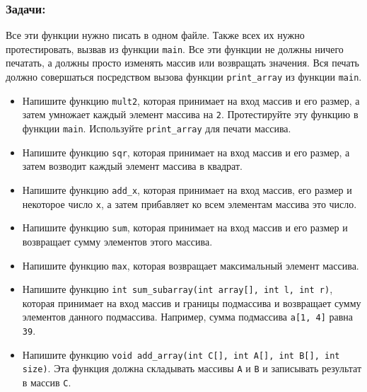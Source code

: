 \documentclass{article}
\begin{document}
\subsubsection*{Задачи:}
Все эти функции нужно писать в одном файле. Также всех их нужно протестировать, вызвав из функции \texttt{main}. Все эти функции не должны ничего печатать, а должны просто изменять массив или возвращать значения. Вся печать должно совершаться посредством вызова функции \texttt{print\_array} из функции \texttt{main}.
\begin{itemize}
\item Напишите функцию \texttt{mult2}, которая принимает на вход массив и его размер, а затем умножает каждый элемент массива на \texttt{2}. Протестируйте эту функцию в функции \texttt{main}. Используйте \texttt{print\_array} для печати массива.
\item Напишите функцию \texttt{sqr}, которая принимает на вход массив и его размер, а затем возводит каждый элемент массива в квадрат.
\item Напишите функцию \texttt{add\_x}, которая принимает на вход массив, его размер и некоторое число \texttt{x}, а затем прибавляет ко всем элементам массива это число.
\item Напишите функцию \texttt{sum}, которая принимает на вход массив и его размер и возвращает сумму элементов этого массива.
\item Напишите функцию \texttt{max}, которая возвращает максимальный элемент массива.
\item Напишите функцию \texttt{int sum\_subarray(int array[], int l, int r)}, которая принимает на вход массив и границы подмассива и возвращает сумму элементов данного подмассива. Например, сумма подмассива \texttt{a[1, 4]} равна \texttt{39}.

\item Напишите функцию \texttt{void add\_array(int C[], int A[], int B[], int size)}. Эта функция должна складывать массивы \texttt{A} и \texttt{B} и записывать результат в массив \texttt{C}. 
\end{itemize}
\newpage
\end{document}

